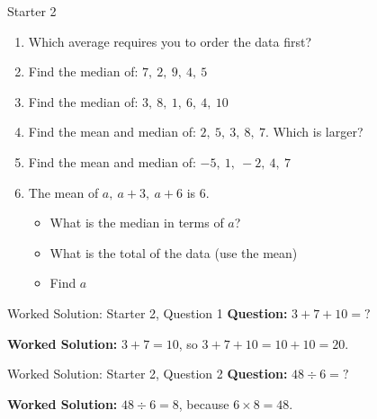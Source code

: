 \documentclass{beamer}
\newcommand{\ashow}[1]{\uncover<2->{\textcolor{red}{\small #1}}}
\newcommand{\ashowq}[1]{\alt<2->{\textcolor{red}{\small #1}}{?}}
\begin{document}
\begin{frame}{Starter 2}
\hypertarget{q-st2}{}
\vspace{-0.8em}

\footnotesize
\begin{enumerate}\itemsep2pt
  \item Which average requires you to order the data first? \ashow{Median}
  \item Find the median of: $7,\ 2,\ 9,\ 4,\ 5$ \ashow{$=5$}
  \item Find the median of: $3,\ 8,\ 1,\ 6,\ 4,\ 10$ \ashow{$=5$}
  \item Find the mean and median of: $2,\ 5,\ 3,\ 8,\ 7$.  
        Which is larger? \ashow{Mean $=5$, median $=5$ (equal).}
  \item Find the mean and median of: $-5,\ 1,\ -2,\ 4,\ 7$ \ashow{Mean $=1$, median $=1$.}
  \item The mean of $a,\ a+3,\ a+6$ is $6$.
        \begin{itemize}\footnotesize
        \item What is the median in terms of $a$? \ashow{$a+3$}
          \item What is the total of the data (use the mean) \ashow{$18$}
          \item Find $a$ \ashow{$a=3$}
        \end{itemize}
\end{enumerate}

\end{frame}

\begin{frame}{Worked Solution: Starter 2, Question 1}
\hypertarget{work-st2}{}
\small
\textbf{Question:} \(3+7+10=\mathord{?}\)

\smallskip
\textbf{Worked Solution:} \(3+7=10\), so \(3+7+10=10+10=20\).
\end{frame}

\begin{frame}{Worked Solution: Starter 2, Question 2}
\small
\textbf{Question:} \(48 \div 6=\mathord{?}\)

\smallskip
\textbf{Worked Solution:} \(48 \div 6 = 8\), because \(6 \times 8 = 48\).
\end{frame}
\end{document}

